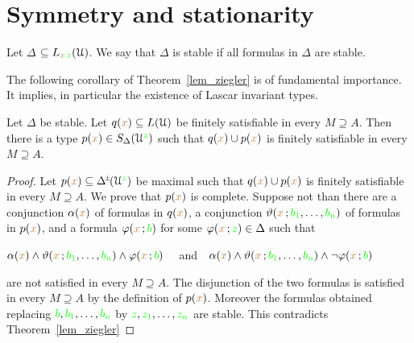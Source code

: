 



\section{Symmetry and stationarity}\label{stationarity}

\def\ceq#1#2#3{\parbox[t]{20ex}{$\displaystyle #1$}\medrel{#2}$\displaystyle  #3$}


Let \emph{$\Delta$\/} $\subseteq L_{{\color{brown} x}\,{\color{green} z}}(\EuScript U)$.
We say that $\Delta$ is stable if all formulas in $\Delta$ are stable.

The following corollary of Theorem~\ref{lem_ziegler} is of fundamental importance.
It implies, in particular the existence of Lascar invariant types.

\begin{corollary}\label{corol_stable_coheir_over_models}
  Let  $\Delta$ be stable.
  Let $q({\color{brown} x})\subseteq L(\EuScript U)$ be finitely satisfiable in every $M\supseteq A$.
  Then there is a type $p({\color{brown} x})\in S_\Delta(\EuScript U^{\color{green} z})$ such that $q({\color{brown} x})\cup p({\color{brown} x})$ is finitely satisfiable in every $M\supseteq A$.
\end{corollary}

\begin{proof}
  Let $p({\mr x})\subseteq \pmDelta(\U^{\gr z})$ be maximal such that $q({\color{brown} x})\cup p({\color{brown} x})$ is finitely satisfiable in every $M\supseteq A$.
  We prove that $p({\color{brown} x})$ is complete.
  Suppose not than there are a conjunction $\alpha({\color{brown} x})$ of formulas in $q({\color{brown} x})$, a conjunction $\vartheta({\color{brown} x}\,;{\color{green} b_1},\dots,{\color{green} b_n})$ of formulas in $p({\color{brown} x})$, and a formula $\varphi({\color{brown} x}\,;{\color{green} b})$ for some $\varphi({\color{brown} x}\,;{\color{green} z})\in\Delta$ such that 

  \hfil$\alpha({\color{brown} x})\wedge\vartheta({\color{brown} x}\,;{\color{green} b_1},\dots,{\color{green} b_n})\wedge\varphi({\color{brown} x}\,;{\color{green} b})$ \ \ and\ \   $\alpha({\color{brown} x})\wedge\vartheta({\color{brown} x}\,;{\color{green} b_1},\dots,{\color{green} b_n})\wedge\neg\varphi({\color{brown} x}\,;{\color{green} b})$ 
 
  are not satisfied in every $M\supseteq A$.
  The disjunction of the two formulas is satisfied in every $M\supseteq A$ by the definition of $p({\color{brown} x})$.
  Moreover the formulas obtained replacing ${\color{green} b},{\color{green} b_1},\dots,{\color{green} b_n}$ by ${\color{green} z},{\color{green} z_1},\dots,{\color{green} z_n}$ are stable.
  This contradicts Theorem~\ref{lem_ziegler}
\end{proof}

